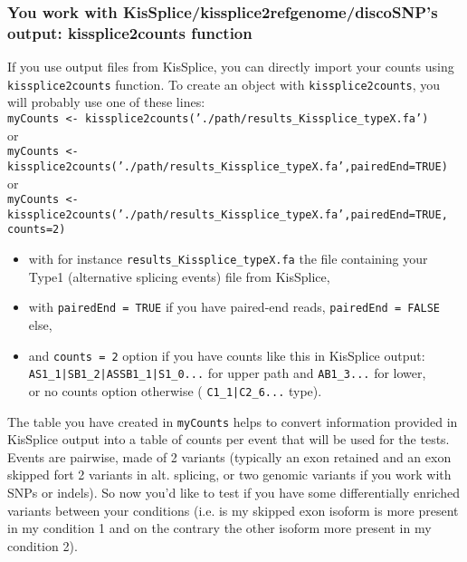 \documentclass[english, a4paper, 12pt]{article}
\begin{document}
\subsubsection{You work with KisSplice/kissplice2refgenome/discoSNP's output: kissplice2counts function}
If you use output files from KisSplice, you can directly import your counts using \texttt{kissplice2counts} function.
To create an object with \texttt{kissplice2counts}, you will probably use one of these lines:\\

  \texttt{myCounts <- kissplice2counts('./path/results\_Kissplice\_typeX.fa')}\\

or \\
  \texttt{myCounts <- kissplice2counts('./path/results\_Kissplice\_typeX.fa',pairedEnd=TRUE)}\\

or\\
  \texttt{myCounts <- kissplice2counts('./path/results\_Kissplice\_typeX.fa',pairedEnd=TRUE, counts=2)}\\

\begin{itemize}
\item with for instance \texttt{results\_Kissplice\_typeX.fa} the file containing your Type1 (alternative splicing events) file from KisSplice,
 \item  with \texttt{pairedEnd = TRUE} if you have paired-end reads, \texttt{pairedEnd = FALSE} else, 
 \item  and \texttt{counts = 2} option if you have counts like this in KisSplice output:\\
 \texttt{AS1\_1|SB1\_2|ASSB1\_1|S1\_0...} for upper path and \texttt{AB1\_3...} for lower,\\
      or no counts option otherwise ( \texttt{C1\_1|C2\_6...} type).
\end{itemize}

The table you have created in \texttt{myCounts} helps to convert information provided in KisSplice output into a table of counts per event that will be used for the tests.\\
Events are pairwise, made of 2 variants (typically an exon retained and an exon skipped fort 2 variants in alt. splicing, or two genomic variants if you work with SNPs or indels). So now you'd like to test if you have some differentially enriched variants between your conditions (i.e. is my skipped exon isoform is more present in my condition 1 and on the contrary the other isoform more present in my condition 2).
\end{document}
